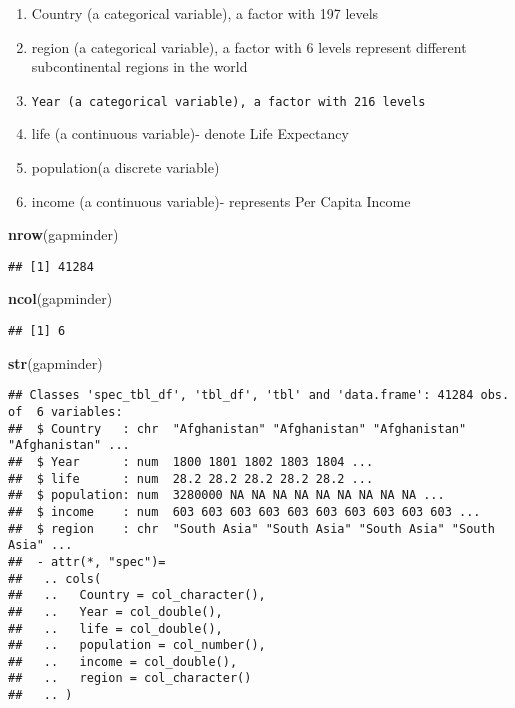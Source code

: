 \documentclass[]{article}
\newenvironment{Shaded}{\begin{snugshade}}{\end{snugshade}}
\newcommand{\KeywordTok}[1]{\textcolor[rgb]{0.13,0.29,0.53}{\textbf{#1}}}
\newcommand{\NormalTok}[1]{#1}
\begin{document}
\begin{enumerate}
\def\labelenumi{\roman{enumi})}
\item
  Country (a categorical variable), a factor with 197 levels
\item
  region (a categorical variable), a factor with 6 levels represent
  different subcontinental regions in the world
\item
\begin{verbatim}
Year (a categorical variable), a factor with 216 levels
\end{verbatim}
\item
  life (a continuous variable)- denote Life Expectancy
\item
  population(a discrete variable)
\item
  income (a continuous variable)- represents Per Capita Income
\end{enumerate}

\begin{Shaded}
\begin{Highlighting}[]
\KeywordTok{nrow}\NormalTok{(gapminder)}
\end{Highlighting}
\end{Shaded}

\begin{verbatim}
## [1] 41284
\end{verbatim}

\begin{Shaded}
\begin{Highlighting}[]
\KeywordTok{ncol}\NormalTok{(gapminder)}
\end{Highlighting}
\end{Shaded}

\begin{verbatim}
## [1] 6
\end{verbatim}

\begin{Shaded}
\begin{Highlighting}[]
\KeywordTok{str}\NormalTok{(gapminder)}
\end{Highlighting}
\end{Shaded}

\begin{verbatim}
## Classes 'spec_tbl_df', 'tbl_df', 'tbl' and 'data.frame': 41284 obs. of  6 variables:
##  $ Country   : chr  "Afghanistan" "Afghanistan" "Afghanistan" "Afghanistan" ...
##  $ Year      : num  1800 1801 1802 1803 1804 ...
##  $ life      : num  28.2 28.2 28.2 28.2 28.2 ...
##  $ population: num  3280000 NA NA NA NA NA NA NA NA NA ...
##  $ income    : num  603 603 603 603 603 603 603 603 603 603 ...
##  $ region    : chr  "South Asia" "South Asia" "South Asia" "South Asia" ...
##  - attr(*, "spec")=
##   .. cols(
##   ..   Country = col_character(),
##   ..   Year = col_double(),
##   ..   life = col_double(),
##   ..   population = col_number(),
##   ..   income = col_double(),
##   ..   region = col_character()
##   .. )
\end{verbatim}
\end{document}

